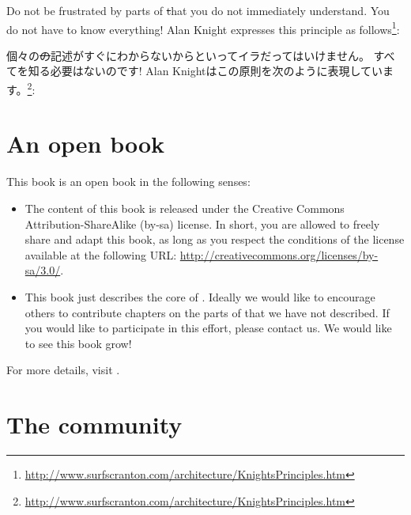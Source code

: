 \documentclass[a4paper,10pt,twoside]{book}
\begin{document}

Do not be frustrated by parts of \st that you do not immediately understand.
You do not have to know everything!
Alan Knight expresses this principle as follows\footnote{\url{http://www.surfscranton.com/architecture/KnightsPrinciples.htm}}:

個々の\st の記述がすぐにわからないからといってイラだってはいけません。
すべてを知る必要はないのです!
Alan Knightはこの原則を次のように表現しています。\footnote{\url{http://www.surfscranton.com/architecture/KnightsPrinciples.htm}}:


\section*{An open book}

This book is an open book in the following senses: 

\begin{itemize}

\item	The content of this book is released under the Creative Commons Attribution-ShareAlike (by-sa) license.
		In short, you are allowed to freely share and adapt this book, as long as you respect the conditions of the license available at the following URL: 
		\url{http://creativecommons.org/licenses/by-sa/3.0/}.

\item	This book just describes the core of \pharo.
		Ideally we would like to encourage others to contribute chapters
		on the parts of \pharo that we have not described.
		If you would like to participate in this effort, please
		contact us.  We would like to see this book grow!
\end{itemize}

For more details, visit \pbe.

\section*{The \pharo community}
\end{document}
